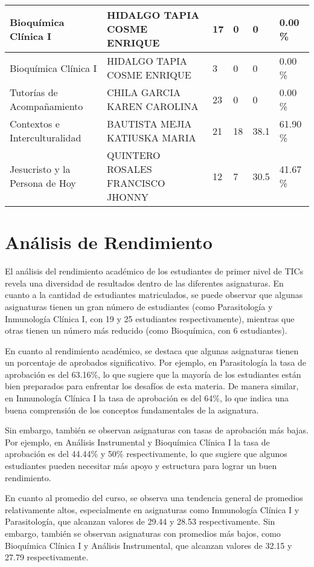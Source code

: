 \begin{tabularx}{\textwidth}{|p{2.5cm}|p{2.5cm}|X|X|X|X|}
Bioquímica Clínica I & HIDALGO TAPIA COSME ENRIQUE & 17 & 0 & 0 & 0.00 \%\\ \hline
Bioquímica Clínica I & HIDALGO TAPIA COSME ENRIQUE & 3 & 0 & 0 & 0.00 \%\\ \hline
Tutorías de Acompañamiento & CHILA GARCIA KAREN CAROLINA & 23 & 0 & 0 & 0.00 \%\\ \hline
Contextos e Interculturalidad & BAUTISTA MEJIA KATIUSKA MARIA & 21 & 18 & 38.1 & 61.90 \%\\ \hline
Jesucristo y la Persona de Hoy & QUINTERO ROSALES FRANCISCO JHONNY & 12 & 7 & 30.5 & 41.67 \%\\ \hline
\end{tabularx}

\vspace{1cm}
\section{Análisis de Rendimiento}
El análisis del rendimiento académico de los estudiantes de primer nivel de TICs revela una diversidad de resultados dentro de las diferentes asignaturas. En cuanto a la cantidad de estudiantes matriculados, se puede observar que algunas asignaturas tienen un gran número de estudiantes (como Parasitología y Inmunología Clínica I, con 19 y 25 estudiantes respectivamente), mientras que otras tienen un número más reducido (como Bioquímica, con 6 estudiantes).

En cuanto al rendimiento académico, se destaca que algunas asignaturas tienen un porcentaje de aprobados significativo. Por ejemplo, en Parasitología la tasa de aprobación es del 63.16\%, lo que sugiere que la mayoría de los estudiantes están bien preparados para enfrentar los desafíos de esta materia. De manera similar, en Inmunología Clínica I la tasa de aprobación es del 64\%, lo que indica una buena comprensión de los conceptos fundamentales de la asignatura.

Sin embargo, también se observan asignaturas con tasas de aprobación más bajas. Por ejemplo, en Análisis Instrumental y Bioquímica Clínica I la tasa de aprobación es del 44.44\% y 50\% respectivamente, lo que sugiere que algunos estudiantes pueden necesitar más apoyo y estructura para lograr un buen rendimiento.

En cuanto al promedio del curso, se observa una tendencia general de promedios relativamente altos, especialmente en asignaturas como Inmunología Clínica I y Parasitología, que alcanzan valores de 29.44 y 28.53 respectivamente. Sin embargo, también se observan asignaturas con promedios más bajos, como Bioquímica Clínica I y Análisis Instrumental, que alcanzan valores de 32.15 y 27.79 respectivamente.

